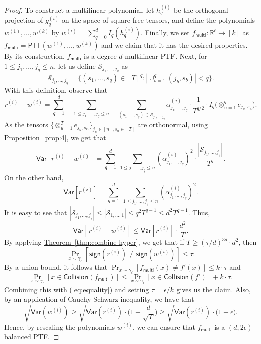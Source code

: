 \documentclass[11pt]{article}
\numberwithin{equation}{section}
\theoremstyle{definition}
\theoremstyle{plain}
\newcommand{\expref}[2]{\hyperref[#2]{#1~\ref{#2}}}
\begin{document}
\begin{proof}
To construct a multilinear polynomial, let $h_q^{(i)}$ be the orthogonal
projection of $g_q^{(i)}$ on the space of square-free tensors, and define the
polynomials $w^{(1)}, \ldots, w^{(k)}$ by
$
w^{(i)} = \sum_{q=0}^d I_q(h_{q}^{(i)}). 
$
Finally, we set $f_{\mathsf{multi}} : \mathbb{R}^{\ell} \rightarrow [k]$ as $f_{\mathsf{multi}} = \mathsf{PTF} (w^{(1)}, \ldots, w^{(k)})$
and we claim that it has the desired properties. By its construction, $f_{\mathsf{multi}}$ is a degree-$d$ multilinear PTF\@.
Next,  for $1 \le j_1, \ldots, j_q \le n$, let us define $\mathcal{S}_{j_1, \ldots, j_q}$ as 
$$
\mathcal{S}_{j_1, \ldots, j_q} = \{(s_1, \ldots, s_q) \in [T]^q : | \cup_{b=1}^q (j_b, s_b) | <  q\}. 
$$
With this definition, observe that
\[
r^{(i)} - w^{(i)}
=  \sum_{q=1}^d \quad \sum_{1 \le j_1, \ldots, j_q \le n}\quad \sum_{(s_1, \ldots, s_q) \in \mathcal{S}_{j_1, \ldots, j_q} } \alpha^{(i)}_{j_1, \ldots, j_q}   \cdot \frac{1}{T^{q/2}} \cdot I_q \big(\otimes_{u=1}^q e_{j_u, s_u} \big).
\]
As the tensors $\{\otimes_{u=1}^T e_{j_u, s_u} \}_{j_u \in [n], s_u \in [T]}$ are orthonormal, using \expref{Proposition}{prop:4}, we get that
$$
\mathsf{Var}[r^{(i)} -  w^{(i)} ] = \sum_{q=1}^d\ \sum_{1 \le j_1, \ldots, j_q \le n}  (\alpha^{(i)}_{j_1, \ldots, j_q})^2 \cdot \frac{|\mathcal{S}_{j_1, \ldots, j_q}|}{T^q}. 
$$
On the other hand, 
$$
\mathsf{Var}[r^{(i)}] = \sum_{q=1}^d\ \sum_{1 \le j_1, \ldots, j_q \le n}  (\alpha^{(i)}_{j_1, \ldots, j_q})^2.
$$
It is easy to see that $|\mathcal{S}_{j_1, \ldots, j_q}| \le |\mathcal{S}_{1,\ldots,1}| \le q^2 T^{q-1} \le d^2 T^{q-1}$. Thus,
$$
\mathsf{Var}[r^{(i)} - w^{(i)} ] \leq \mathsf{Var}[r^{(i)} ] \cdot \frac{d^2}{T}. 
$$
By applying \expref{Theorem}{thm:combine-hyper}, we get that if $T \ge (\tau/d)^{3d} \cdot d^2$, then 
$$
\Pr_{x \sim \gamma_\ell} [\mathsf{sign} (r^{(i)})  \neq  \mathsf{sign} (w^{(i)})] \le \tau. 
$$
By a union bound, it follows that
$
\Pr_{x \sim \gamma_\ell} [f_{\mathsf{multi}}(x) \neq  f'(x)]   \le k \cdot \tau
$
and
\[
\Pr_{x \sim \gamma_\ell} [x \in \mathsf{Collision} (f_{\mathsf{multi}})] \leq \Pr_{x \sim \gamma_\ell} [x \in \mathsf{Collision} (f')] + k \cdot \tau. 
\]
Combining this with (\ref{eq:equality}) and setting $\tau = \epsilon/k$ gives us the claim. Also, by an application of Cauchy-Schwarz inequality, we have that 
\[
\sqrt{\mathsf{Var}(w^{(i)})} \ge \sqrt{\mathsf{Var}(r^{(i)})}  \cdot \bigg( 1- \frac{d}{\sqrt{T}}\bigg) \ge \sqrt{\mathsf{Var}(r^{(i)})}  \cdot \big( 1- \epsilon\big).
\]
Hence, by rescaling the polynomials $w^{(i)}$,  we can ensure that $f_{\mathsf{multi}}$ is a $(d,2\epsilon)$-balanced PTF.
\end{proof}
\end{document}
